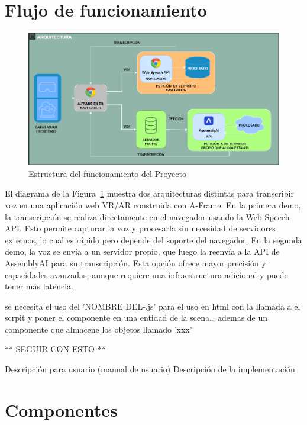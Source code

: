 \documentclass[a4paper, 12pt]{book}
\begin{document}
\section{Flujo de funcionamiento} 
\label{sec:funcionamiento}
\begin{figure}[H]
  \centering
  \includegraphics[width=14cm, keepaspectratio]{img/Arquitectura.png}
  \caption{Estructura del funcionamiento del Proyecto}
  \label{fig:arquitectura}
\end{figure}


El diagrama de la Figura~\ref{fig:arquitectura} muestra dos arquitecturas distintas para transcribir voz en una aplicación web VR/AR construida con A-Frame. En la primera demo, la transcripción se realiza directamente en el navegador usando la Web Speech API. Esto permite capturar la voz y procesarla sin necesidad de servidores externos, lo cual es rápido pero depende del soporte del navegador. En la segunda demo, la voz se envía a un servidor propio, que luego la reenvía a la API de AssemblyAI para su transcripción. Esta opción ofrece mayor precisión y capacidades avanzadas, aunque requiere una infraestructura adicional y puede tener más latencia.

se necesita el uso del 'NOMBRE DEL-.js' para el uso en html con la llamada a el scrpit y poner el componente en una entidad de la scena\dots
ademas de un componente que almacene los objetos llamado 'xxx'

** SEGUIR CON ESTO **

Descripción para usuario (manual de usuario)
Descripción de la implementación
\section{Componentes} 
\label{sec:Componentes}
\end{document}
